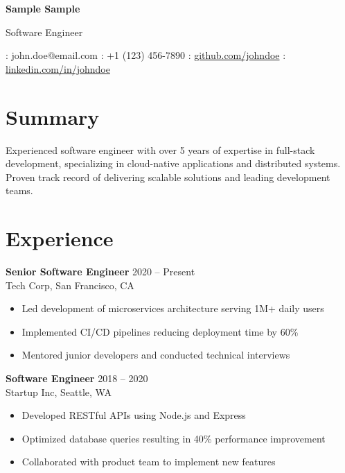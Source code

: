 \documentclass[11pt,a4paper]{article}
\newcommand{\contactItem}[2]{#1: #2\hspace{1cm}}
\begin{document}
\begin{center}
    {\Huge\textbf{Sample Sample}}

    \vspace{0.5em}
    {\large Software Engineer}

    \vspace{1em}
    \contactItem{\faEnvelope}{john.doe@email.com}
    \contactItem{\faPhone}{+1 (123) 456-7890}
    \contactItem{\faGithub}{\href{https://github.com/johndoe}{github.com/johndoe}}
    \contactItem{\faLinkedin}{\href{https://linkedin.com/in/johndoe}{linkedin.com/in/johndoe}}
\end{center}

\section{Summary}
Experienced software engineer with over 5 years of expertise in full-stack development,
specializing in cloud-native applications and distributed systems.
Proven track record of delivering scalable solutions and leading development teams.

\section{Experience}
\textbf{Senior Software Engineer} \hfill 2020 -- Present\\
Tech Corp, San Francisco, CA
\begin{itemize}[leftmargin=*]
    \item Led development of microservices architecture serving 1M+ daily users
    \item Implemented CI/CD pipelines reducing deployment time by 60\%
    \item Mentored junior developers and conducted technical interviews
\end{itemize}

\textbf{Software Engineer} \hfill 2018 -- 2020\\
Startup Inc, Seattle, WA
\begin{itemize}[leftmargin=*]
    \item Developed RESTful APIs using Node.js and Express
    \item Optimized database queries resulting in 40\% performance improvement
    \item Collaborated with product team to implement new features
\end{itemize}

\end{document}
